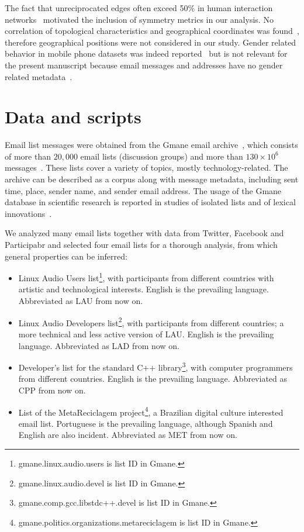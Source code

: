 \documentclass[%
	aip,
	jmp,%
	amsmath,amssymb,
	reprint,%
]{revtex4-1}
\begin{document}
The fact that unreciprocated edges often exceed 50\% in human interaction networks~\cite{newmanEvolving} motivated the inclusion of symmetry metrics in our analysis.
No correlation of topological characteristics and geographical coordinates was found~\cite{barabasiGeo},
therefore geographical positions were not considered in our study.
Gender related behavior in mobile phone datasets was indeed reported~\cite{barabasiSex}
but is not relevant for the present manuscript because email messages and addresses have no gender related metadata~\cite{gmanePack}.


\section{Data and scripts}\label{sec:data}\label{scripts}

Email list messages were obtained from
the Gmane email archive~\cite{gmanePack}, which consists of more than $20,000$
email lists (discussion groups) and more than $130\times 10^6$ messages~\cite{Gmanewikipedia}. These lists cover a variety of topics, mostly technology-related. The archive can be described as a corpus along with message metadata, including sent time, place, sender name, and sender email address.
The usage of the Gmane database in scientific research is reported in studies of isolated lists and of lexical innovations~\cite{Gmane2,bird}. 

We analyzed many email lists together with data from Twitter, Facebook and Participabr
and selected four email lists for a thorough analysis,
from which general properties can be inferred:
\begin{itemize}
	\item Linux Audio Users list\footnote{gmane.linux.audio.users is list ID in Gmane.},
		with participants from different countries with artistic and technological interests.
		English is the prevailing language. Abbreviated as LAU from now on.
	\item Linux Audio Developers list\footnote{gmane.linux.audio.devel is list ID in Gmane.},
		with participants from different countries;
		a more technical and less active version of LAU.
		English is the prevailing language. 
		Abbreviated as LAD from now on.
	\item Developer's list for the standard C++ library\footnote{gmane.comp.gcc.libstdc++.devel is list ID in Gmane.},
		with computer programmers from different countries.
		English is the prevailing language.
		Abbreviated as CPP from now on.
	\item List of the MetaReciclagem project\footnote{gmane.politics.organizations.metareciclagem is list ID in Gmane.},
		a Brazilian digital culture interested email list.
		Portuguese is the prevailing language,
		although Spanish and English are also incident.
		Abbreviated as MET from now on.
\end{itemize} 
\end{document}
